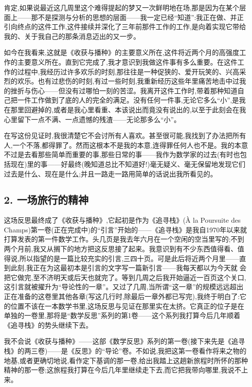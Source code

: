 肯定,如果说最近这几周里这个难得提起的梦又一次鲜明地在场,那是因为在某个层面上——那不是探测与分析的思想的层面——我一定已经“知道”:我正在做、并正引向终点的这件工作,这件接续并深化了三年前那件工作的工作,是向着实现它带给我的、关于我自己的那条消息迈出的又一步。

如今在我看来,这就是《收获与播种》的主要意义所在,这件将近两个月的高强度工作的主要意义所在。直到它完成了,我才意识到我做这件事有多么重要。在这件工作的过程中,我经历过许多欢乐的时刻,那往往是一种促狭的、爱开玩笑的、兴高采烈的欢乐。也有过悲伤的时刻,有过一些时刻,我重新经历这些年里痛苦地击中过我的挫折与伤心——但没有过哪怕一刻的苦涩。我离开这件工作时,带着那种知道自己把一件工作做到了底的人的完全的满足。没有任何一件事,无论它多么“小”,是我在那里回避掉的,或者是我心里看重、本该说出而竟没有说出的,以至于此刻会在我心里留下一点不满、一点遗憾的残渣——无论那多么“小”。

在写这份见证时,我很清楚它不会讨所有人喜欢。甚至很可能,我找到了办法把所有人,一个不落,都得罪了。然而这根本不是我的本意,连得罪任何人也不是。我的本意不过是去看那些简单而重要的事,那些日常的事——我作为数学家的过去(有时也包括现在)里的事——好最终(晚知道总比不知道好!)毫无疑义、毫无保留地发现它们过去是什么、现在是什么;并且一路走一路用简单的话说出我所看见的。

\subsection{2. 一场旅行的精神}

这场反思最终成了《收获与播种》,它起初是作为《追寻栈》(À la Poursuite des Champs)第一卷(正在完成中)的“引言”开始的——《追寻栈》是我自1970年以来就打算发表的第一件数学工作。头几页是我去年六月在一个空闲的空当里写的;不到两个月前,我又从搁下的地方把这反思接了起来。我意识到有不少东西值得看、值得说,所以指望的是一篇比较充实的引言,三四十页。可是此后将近两个月里——直到此刻,我正在为这最初本是引言的文字写一篇新引言——我每天都以为今天就
会把它做完,至不济明天或后天也就完了。等到几周之后我开始逼近一百页这个关口,这引言就被擢升为“导论性的一章”。又过了几周,当所谓“这一章”的规模远远超出正在准备的这卷里其他各章(写这几行时,除最后一章外都已写完),我终于明白了:它的位置不该在一本数学书里,这场反思与见证在那里实在太挤。它真正的位子是在单独的一卷里,那将是“数学反思”系列的第1卷——这个系列我打算今后几年顺着《追寻栈》的势头继续下去。

我不会说《收获与播种》——这部《数学反思》系列的第一卷(接下来先是《追寻栈》的两三卷)——是《反思》的“导论”卷。不如说,我把这第一卷看作将来之物的地基,或者更确切地说,看作定下基调的那一卷,给出我踏上这趟新旅程时所怀的那种精神的那一卷;这旅程我打算在今后几年里继续走下去,而它把我带向哪里,我说不上来。

